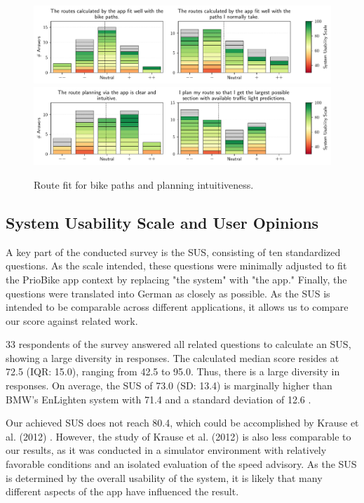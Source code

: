 \begin{figure}[!b]
\caption{Route fit for bike paths and planning intuitiveness.}\label{fig:route-fit-bike-paths}
\includegraphics[width=\linewidth]{images/app-usability-questions-route-fit-bike-paths.pdf}
\\
\includegraphics[width=\linewidth]{images/app-usability-questions-route-planning-intuitiveness.pdf}
\end{figure}

\subsection{System Usability Scale and User Opinions}

A key part of the conducted survey is the SUS, consisting of ten standardized questions. As the scale intended, these questions were minimally adjusted to fit the PrioBike app context by replacing "the system" with "the app." Finally, the questions were translated into German as closely as possible. As the SUS is intended to be comparable across different applications, it allows us to compare our score against related work. 

33 respondents of the survey answered all related questions to calculate an SUS, showing a large diversity in responses. The calculated median score resides at 72.5 (IQR: 15.0), ranging from 42.5 to 95.0. Thus, there is a large diversity in responses. On average, the SUS of 73.0 (SD: 13.4) is marginally higher than BMW's EnLighten system with 71.4 and a standard deviation of 12.6 \cite{wilson_driver_2017}. 

Our achieved SUS does not reach 80.4, which could be accomplished by Krause et al. (2012) \cite{krause_traffic_2012}. However, the study of Krause et al. (2012) \cite{krause_traffic_2012} is also less comparable to our results, as it was conducted in a simulator environment with relatively favorable conditions and an isolated evaluation of the speed advisory. As the SUS is determined by the overall usability of the system, it is likely that many different aspects of the app have influenced the result.

